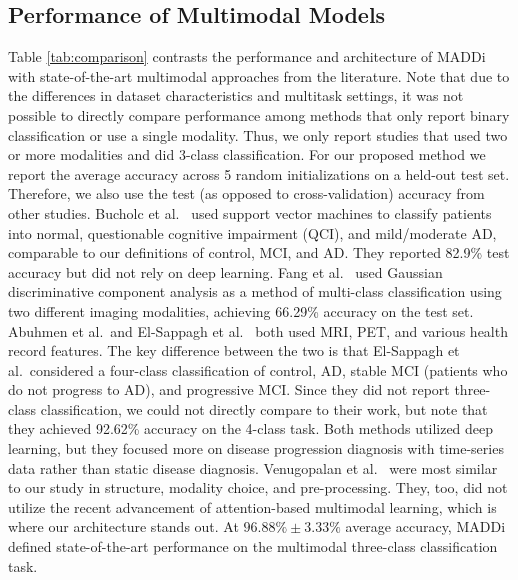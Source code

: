 \documentclass[11pt]{article}
\begin{document}
\subsection*{Performance of Multimodal Models}
Table \ref{tab:comparison} contrasts the performance and architecture of MADDi with state-of-the-art multimodal approaches from the literature. Note that due to the differences in dataset characteristics and multitask settings, it was not possible to directly compare performance among methods that only report binary classification or use a single modality. Thus, we only report studies that used two or more modalities and did 3-class classification. For our proposed method we report the average accuracy across 5 random initializations on a held-out test set. Therefore, we also use the test (as opposed to cross-validation) accuracy from other studies. 
Bucholc et al.\ \cite{BUCHOLC2019157} used support vector machines to classify patients into normal, questionable cognitive impairment (QCI), and mild/moderate AD, comparable to our definitions of control, MCI, and AD. They reported 82.9\% test accuracy but did not rely on deep learning.
Fang et al.\ \cite{FANG2020108856} used Gaussian discriminative component analysis as a method of multi-class classification using two different imaging modalities, achieving 66.29\% accuracy on the test set. 
Abuhmen et al.\ and El-Sappagh et al.\ \cite{ABUHMED2021106688, ELSAPPAGH2020197} both used MRI, PET, and various health record features. The key difference between the two is that El-Sappagh et al.\ considered a four-class classification of control, AD, stable MCI (patients who do not progress to AD), and progressive MCI. Since they did not report three-class classification, we could not directly compare to their work, but note that they achieved 92.62\% accuracy on the 4-class task. Both methods utilized deep learning, but they focused more on disease progression diagnosis with time-series data rather than static disease diagnosis. 
Venugopalan et al.\ \cite{venugopalan2021multimodal} were most similar to our study in structure, modality choice, and pre-processing. They, too, did not utilize the recent advancement of attention-based multimodal learning, which is where our architecture stands out. 
At $96.88\% \pm 3.33\%$ average accuracy, MADDi defined state-of-the-art performance on the multimodal three-class classification task. 
\end{document}
